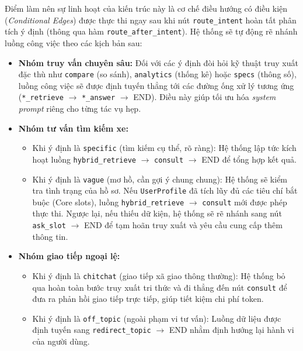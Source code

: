 Điểm làm nên sự linh hoạt của kiến trúc này là cơ chế điều hướng có điều kiện (\textit{Conditional Edges}) được thực thi ngay sau khi nút \texttt{route\_intent} hoàn tất phân tích ý định (thông qua hàm \texttt{route\_after\_intent}). Hệ thống sẽ tự động rẽ nhánh luồng công việc theo các kịch bản sau:

\begin{itemize}
    \item \textbf{Nhóm truy vấn chuyên sâu:} Đối với các ý định đòi hỏi kỹ thuật truy xuất đặc thù như \texttt{compare} (so sánh), \texttt{analytics} (thống kê) hoặc \texttt{specs} (thông số), luồng công việc sẽ được định tuyến thẳng tới các đường ống xử lý tương ứng (\texttt{*\_retrieve} $\rightarrow$ \texttt{*\_answer} $\rightarrow$ END). Điều này giúp tối ưu hóa \textit{system prompt} riêng cho từng tác vụ hẹp.
    
    \item \textbf{Nhóm tư vấn tìm kiếm xe:}
    \begin{itemize}
        \item Khi ý định là \texttt{specific} (tìm kiếm cụ thể, rõ ràng): Hệ thống lập tức kích hoạt luồng \texttt{hybrid\_retrieve} $\rightarrow$ \texttt{consult} $\rightarrow$ END để tổng hợp kết quả.
        \item Khi ý định là \texttt{vague} (mơ hồ, cần gợi ý chung chung): Hệ thống sẽ kiểm tra tình trạng của hồ sơ. Nếu \texttt{UserProfile} đã tích lũy đủ các tiêu chí bắt buộc (Core slots), luồng \texttt{hybrid\_retrieve} $\rightarrow$ \texttt{consult} mới được phép thực thi. Ngược lại, nếu thiếu dữ kiện, hệ thống sẽ rẽ nhánh sang nút \texttt{ask\_slot} $\rightarrow$ END để tạm hoãn truy xuất và yêu cầu cung cấp thêm thông tin.
    \end{itemize}
    
    \item \textbf{Nhóm giao tiếp ngoại lệ:} 
    \begin{itemize}
        \item Khi ý định là \texttt{chitchat} (giao tiếp xã giao thông thường): Hệ thống bỏ qua hoàn toàn bước truy xuất tri thức và đi thẳng đến nút \texttt{consult} để đưa ra phản hồi giao tiếp trực tiếp, giúp tiết kiệm chi phí token.
        \item Khi ý định là \texttt{off\_topic} (ngoài phạm vi tư vấn): Luồng dữ liệu được định tuyến sang \texttt{redirect\_topic} $\rightarrow$ END nhằm định hướng lại hành vi của người dùng.
    \end{itemize}
\end{itemize}


